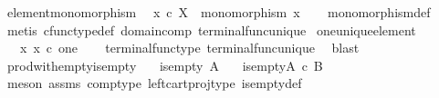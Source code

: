 \begin{isabellebody}
\ element{\isacharunderscore}{\kern0pt}monomorphism{\isacharcolon}{\kern0pt}\isanewline
\ \ {\isachardoublequoteopen}x\ {\isasymin}\isactrlsub c\ X\ {\isasymLongrightarrow}\ monomorphism\ x{\isachardoublequoteclose}\isanewline
%
\isadelimproof
\ \ %
\endisadelimproof
%
\isatagproof
{}\isamarkupfalse%
\ monomorphism{\isacharunderscore}{\kern0pt}def\isanewline
\ \ \isamarkupfalse%
\ {\isacharparenleft}{\kern0pt}metis\ cfunc{\isacharunderscore}{\kern0pt}type{\isacharunderscore}{\kern0pt}def\ domain{\isacharunderscore}{\kern0pt}comp\ terminal{\isacharunderscore}{\kern0pt}func{\isacharunderscore}{\kern0pt}unique{\isacharparenright}{\kern0pt}%
\endisatagproof
{\isafoldproof}%
%
\isadelimproof
\isanewline
%
\endisadelimproof
\isanewline
{}\isamarkupfalse%
\ one{\isacharunderscore}{\kern0pt}unique{\isacharunderscore}{\kern0pt}element{\isacharcolon}{\kern0pt}\isanewline
\ \ {\isachardoublequoteopen}{\isasymexists}{\isacharbang}{\kern0pt}\ x{\isachardot}{\kern0pt}\ x\ {\isasymin}\isactrlsub c\ one{\isachardoublequoteclose}\isanewline
%
\isadelimproof
\ \ %
\endisadelimproof
%
\isatagproof
{}\isamarkupfalse%
\ terminal{\isacharunderscore}{\kern0pt}func{\isacharunderscore}{\kern0pt}type\ terminal{\isacharunderscore}{\kern0pt}func{\isacharunderscore}{\kern0pt}unique\ \isamarkupfalse%
\ blast%
\endisatagproof
{\isafoldproof}%
%
\isadelimproof
\isanewline
%
\endisadelimproof
\isanewline
{}\isamarkupfalse%
\ prod{\isacharunderscore}{\kern0pt}with{\isacharunderscore}{\kern0pt}empty{\isacharunderscore}{\kern0pt}is{\isacharunderscore}{\kern0pt}empty{}{\isacharcolon}{\kern0pt}\isanewline
\ \ \ {\isachardoublequoteopen}is{\isacharunderscore}{\kern0pt}empty\ {\isacharparenleft}{\kern0pt}A{\isacharparenright}{\kern0pt}{\isachardoublequoteclose}\isanewline
\ \ \ {\isachardoublequoteopen}is{\isacharunderscore}{\kern0pt}empty{\isacharparenleft}{\kern0pt}A\ {\isasymtimes}\isactrlsub c\ B{\isacharparenright}{\kern0pt}{\isachardoublequoteclose}\isanewline
%
\isadelimproof
\ \ %
\endisadelimproof
%
\isatagproof
{}\isamarkupfalse%
\ {\isacharparenleft}{\kern0pt}meson\ assms\ comp{\isacharunderscore}{\kern0pt}type\ left{\isacharunderscore}{\kern0pt}cart{\isacharunderscore}{\kern0pt}proj{\isacharunderscore}{\kern0pt}type\ is{\isacharunderscore}{\kern0pt}empty{\isacharunderscore}{\kern0pt}def{\isacharparenright}{\kern0pt}%
\endisatagproof
{\isafoldproof}%
%
\isadelimproof
\isanewline
%
\endisadelimproof
\isanewline
{}\isamarkupfalse%

\end{isabellebody}
